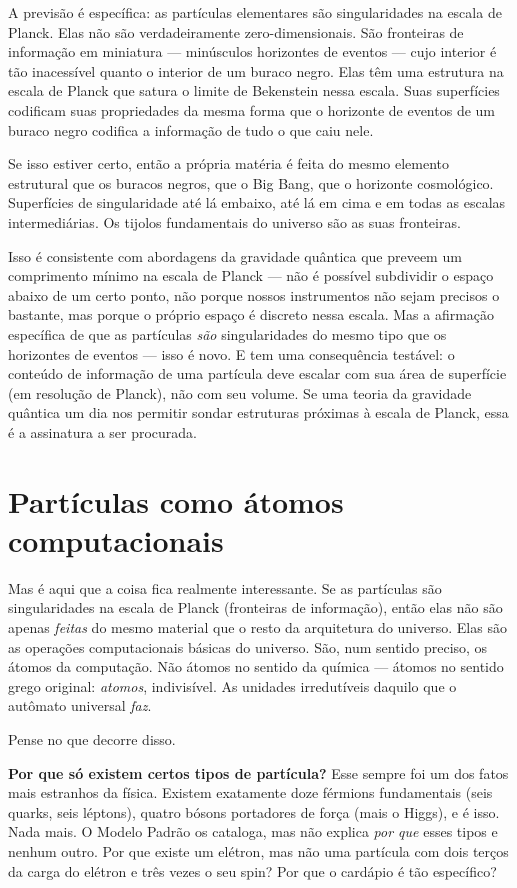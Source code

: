 \documentclass[11pt, twoside, openright]{book}
\begin{document}
A previsão é específica: as partículas elementares são singularidades na escala de Planck. Elas não são verdadeiramente zero-dimensionais. São fronteiras de informação em miniatura --- minúsculos horizontes de eventos --- cujo interior é tão inacessível quanto o interior de um buraco negro. Elas têm uma estrutura na escala de Planck que satura o limite de Bekenstein nessa escala. Suas superfícies codificam suas propriedades da mesma forma que o horizonte de eventos de um buraco negro codifica a informação de tudo o que caiu nele.

Se isso estiver certo, então a própria matéria é feita do mesmo elemento estrutural que os buracos negros, que o Big Bang, que o horizonte cosmológico. Superfícies de singularidade até lá embaixo, até lá em cima e em todas as escalas intermediárias. Os tijolos fundamentais do universo são as suas fronteiras.

Isso é consistente com abordagens da gravidade quântica que preveem um comprimento mínimo na escala de Planck --- não é possível subdividir o espaço abaixo de um certo ponto, não porque nossos instrumentos não sejam precisos o bastante, mas porque o próprio espaço é discreto nessa escala. Mas a afirmação específica de que as partículas \textit{são} singularidades do mesmo tipo que os horizontes de eventos --- isso é novo. E tem uma consequência testável: o conteúdo de informação de uma partícula deve escalar com sua área de superfície (em resolução de Planck), não com seu volume. Se uma teoria da gravidade quântica um dia nos permitir sondar estruturas próximas à escala de Planck, essa é a assinatura a ser procurada.

\section*{Partículas como átomos computacionais}

Mas é aqui que a coisa fica realmente interessante. Se as partículas são singularidades na escala de Planck (fronteiras de informação), então elas não são apenas \textit{feitas} do mesmo material que o resto da arquitetura do universo. Elas são as operações computacionais básicas do universo. São, num sentido preciso, os átomos da computação. Não átomos no sentido da química --- átomos no sentido grego original: \textit{atomos}, indivisível. As unidades irredutíveis daquilo que o autômato universal \textit{faz}.

Pense no que decorre disso.

\textbf{Por que só existem certos tipos de partícula?} Esse sempre foi um dos fatos mais estranhos da física. Existem exatamente doze férmions fundamentais (seis quarks, seis léptons), quatro bósons portadores de força (mais o Higgs), e é isso. Nada mais. O Modelo Padrão os cataloga, mas não explica \textit{por que} esses tipos e nenhum outro. Por que existe um elétron, mas não uma partícula com dois terços da carga do elétron e três vezes o seu spin? Por que o cardápio é tão específico?
\end{document}
